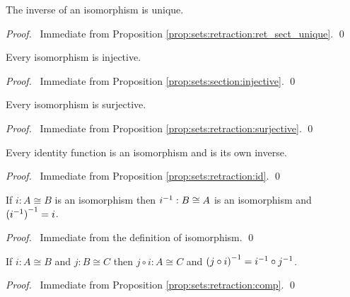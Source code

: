 \begin{prop}
The inverse of an isomorphism is unique.
\end{prop}

\begin{proof}
\pf\ Immediate from Proposition \ref{prop:sets:retraction:ret_sect_unique}. \qed
\end{proof}

\begin{prop}
Every isomorphism is injective.
\end{prop}

\begin{proof}
\pf\ Immediate from Proposition \ref{prop:sets:section:injective}. \qed
\end{proof}

\begin{prop}
Every isomorphism is surjective.
\end{prop}

\begin{proof}
\pf\ Immediate from Proposition \ref{prop:sets:retraction:surjective}. \qed
\end{proof}

\begin{prop}
\label{prop:sets:isomorphism:identity}
Every identity function is an isomorphism and is its own inverse.
\end{prop}

\begin{proof}
\pf\ Immediate from Proposition \ref{prop:sets:retraction:id}. \qed
\end{proof}

\begin{prop}
\label{prop:sets:isomorphism:inverse}
If $i : A \cong B$ is an isomorphism then ${i}^{-1} : B \cong A$ is an
isomorphism and ${({i}^{-1})}^{-1} = i$.
\end{prop}

\begin{proof}
\pf\ Immediate from the definition of isomorphism. \qed
\end{proof}

\begin{prop}
  \label{prop:sets:isomorphism:comp}
If $i : A \cong B$ and $j : B \cong C$ then $j \circ i : A \cong C$ and
${(j \circ i)}^{-1} = {i}^{-1} \circ {j}^{-1}$.
\end{prop}

\begin{proof}
\pf\ Immediate from Proposition \ref{prop:sets:retraction:comp}. \qed
\end{proof}


